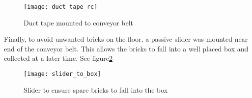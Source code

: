 \begin{figure}[H]
	\centering
	\texttt{[image: duct\_tape\_rc]}
	\caption{Duct tape mounted to conveyor belt}
	\label{fig:duct_tape}
\end{figure} Finally, to avoid unwanted bricks on the 
floor, a passive slider was mounted near end of the conveyor belt. This allows 
the bricks to fall into a well placed box and collected at a later 
time. See figure\ref{fig:slider} 
\begin{figure}[H]
	\centering
	\texttt{[image: slider\_to\_box]}
	\caption{Slider to ensure spare bricks to fall into the box}
	\label{fig:slider}
\end{figure}

